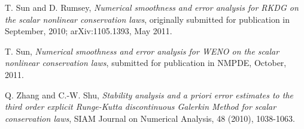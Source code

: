 \documentclass{article}
\numberwithin{equation}{section}
\begin{document}
\begin{spacing}{1.15}
\begin{thebibliography}{10}
 T. Sun and  D. Rumsey, {\em Numerical smoothness and error analysis
for RKDG on the scalar nonlinear conservation laws}, originally
submitted for publication in September, 2010; arXiv:1105.1393, May
2011.

 T. Sun, {\em Numerical smoothness and error analysis
for WENO on the scalar nonlinear conservation laws}, submitted for
publication in NMPDE, October, 2011.

   Q. Zhang and C.-W. Shu, {\em Stability analysis and a priori
error estimates to the third order explicit Runge-Kutta
discontinuous Galerkin Method for scalar conservation laws}, SIAM
Journal on Numerical Analysis, 48 (2010), 1038-1063.

\end{thebibliography}

\end{spacing}
\end{document}
